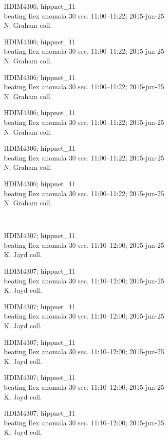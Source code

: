 \documentclass[2pt]{extarticle}
\begin{document}
\noindent
\parbox{0.16\textwidth}{\tiny \raggedright \rule[-0.3\baselineskip]{0pt}{10pt}HDIM4306; hippnet\_11\\ beating Ilex anomala 30 sec. 11:00--11:22; 2015-jun-25\\ N. Graham coll.}
\parbox{0.16\textwidth}{\tiny \raggedright \rule[-0.3\baselineskip]{0pt}{10pt}HDIM4306; hippnet\_11\\ beating Ilex anomala 30 sec. 11:00--11:22; 2015-jun-25\\ N. Graham coll.}
\parbox{0.16\textwidth}{\tiny \raggedright \rule[-0.3\baselineskip]{0pt}{10pt}HDIM4306; hippnet\_11\\ beating Ilex anomala 30 sec. 11:00--11:22; 2015-jun-25\\ N. Graham coll.}
\parbox{0.16\textwidth}{\tiny \raggedright \rule[-0.3\baselineskip]{0pt}{10pt}HDIM4306; hippnet\_11\\ beating Ilex anomala 30 sec. 11:00--11:22; 2015-jun-25\\ N. Graham coll.}
\parbox{0.16\textwidth}{\tiny \raggedright \rule[-0.3\baselineskip]{0pt}{10pt}HDIM4306; hippnet\_11\\ beating Ilex anomala 30 sec. 11:00--11:22; 2015-jun-25\\ N. Graham coll.}
\parbox{0.16\textwidth}{\tiny \raggedright \rule[-0.3\baselineskip]{0pt}{10pt}HDIM4306; hippnet\_11\\ beating Ilex anomala 30 sec. 11:00--11:22; 2015-jun-25\\ N. Graham coll.} \\ 
\vspace{0.001in} 

\noindent
\parbox{0.16\textwidth}{\tiny \raggedright \rule[-0.3\baselineskip]{0pt}{10pt}HDIM4307; hippnet\_11\\ beating Ilex anomala 30 sec. 11:10--12:00; 2015-jun-25\\ K. Jayd coll.}
\parbox{0.16\textwidth}{\tiny \raggedright \rule[-0.3\baselineskip]{0pt}{10pt}HDIM4307; hippnet\_11\\ beating Ilex anomala 30 sec. 11:10--12:00; 2015-jun-25\\ K. Jayd coll.}
\parbox{0.16\textwidth}{\tiny \raggedright \rule[-0.3\baselineskip]{0pt}{10pt}HDIM4307; hippnet\_11\\ beating Ilex anomala 30 sec. 11:10--12:00; 2015-jun-25\\ K. Jayd coll.}
\parbox{0.16\textwidth}{\tiny \raggedright \rule[-0.3\baselineskip]{0pt}{10pt}HDIM4307; hippnet\_11\\ beating Ilex anomala 30 sec. 11:10--12:00; 2015-jun-25\\ K. Jayd coll.}
\parbox{0.16\textwidth}{\tiny \raggedright \rule[-0.3\baselineskip]{0pt}{10pt}HDIM4307; hippnet\_11\\ beating Ilex anomala 30 sec. 11:10--12:00; 2015-jun-25\\ K. Jayd coll.}
\parbox{0.16\textwidth}{\tiny \raggedright \rule[-0.3\baselineskip]{0pt}{10pt}HDIM4307; hippnet\_11\\ beating Ilex anomala 30 sec. 11:10--12:00; 2015-jun-25\\ K. Jayd coll.} \\ 
\vspace{0.001in} 
\end{document}
